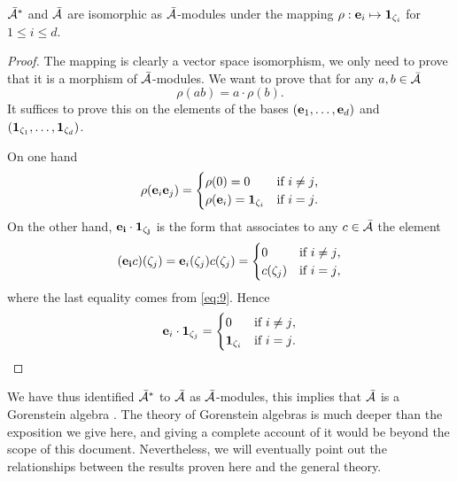 \begin{proposition}
  \label{th:gorenstein}
  $\bar{\mathcal{A}}^\ast$ and $\bar{\mathcal{A}}$ are isomorphic as
  $\bar{\mathcal{A}}$-modules under the mapping
  $\rho:\mathbf{e}_i\mapsto\mathbf{1}_{\zeta_i}$ for $1\le i\le d$.
\end{proposition}
\begin{proof}
  The mapping is clearly a vector space isomorphism, we only need to
  prove that it is a morphism of $\bar{\mathcal{A}}$-modules. We want
  to prove that for any $a,b\in\bar{\mathcal{A}}$
  \[\rho(ab) = a\cdot\rho(b)\text{.}\]
  It suffices to prove this on the elements of the bases
  $(\mathbf{e}_1,\ldots,\mathbf{e}_d)$ and
  $(\mathbf{1}_{\zeta_1},\ldots,\mathbf{1}_{\zeta_d})$.

  On one hand
  \begin{equation}
    \label{eq:12}
    \rho(\mathbf{e}_i\mathbf{e}_j)=
    \begin{cases}
      \rho(0)=0 &\text{if $i\ne j$,}\\
      \rho(\mathbf{e}_i)=\mathbf{1}_{\zeta_i} &\text{if $i=j$.}
    \end{cases}
  \end{equation}
  On the other hand, $\mathbf{e_i}\cdot\mathbf{1_{\zeta_j}}$ is the form
  that associates to any $c\in\bar{\mathcal{A}}$ the element
  \begin{equation}
    \label{eq:13}
    (\mathbf{e_i}c)(\zeta_j) = \mathbf{e}_i(\zeta_j)c(\zeta_j) = 
    \begin{cases}
      0 &\text{if $i\ne j$,}\\
      c(\zeta_j) &\text{if $i=j$,}
    \end{cases}
  \end{equation}
  where the last equality comes from \eqref{eq:9}. Hence
  \begin{equation}
    \label{eq:14}
    \mathbf{e}_i\cdot\mathbf{1}_{\zeta_j}=
    \begin{cases}
      0 &\text{if $i\ne j$,}\\
      \mathbf{1}_{\zeta_i} &\text{if $i=j$.}
    \end{cases}
  \end{equation}
\end{proof}

\begin{note}
  We have thus identified $\bar{\mathcal{A}}^\ast$ to
  $\bar{\mathcal{A}}$ as $\bar{\mathcal{A}}$-modules, this implies that
  $\bar{\mathcal{A}}$ is a Gorenstein algebra \cite[Chapter
  8]{mourrain+elkadi}. The theory of Gorenstein algebras is much
  deeper than the exposition we give here, and giving a complete
  account of it would be beyond the scope of this
  document. Nevertheless, we will eventually point out the
  relationships between the results proven here and the general
  theory.
\end{note}

